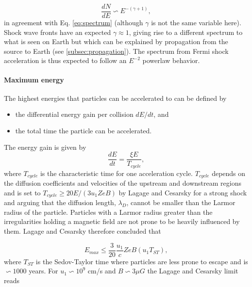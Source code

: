 \begin{equation}
\frac{dN}{dE} \backsim E^{-(\gamma + 1)},
\end{equation}
in agreement with Eq. \ref{eq:spectrum} (although $\gamma$ is not the same variable here). Shock wave fronts have an expected $\gamma \approx 1$, giving rise to a different spectrum to what is seen on Earth but which can be explained by propagation from the source to Earth (see \ref{subsec:propagation}). The spectrum from Fermi shock acceleration is thus expected to follow an $E^{-2}$ powerlaw behavior.

\paragraph{Maximum energy}
\label{para:maxenergy}
The highest energies that particles can be accelerated to can be defined by

\vspace{2mm}
\begin{itemize}
\item the differential energy gain per collision $dE/dt$, and
\item the total time the particle can be accelerated.
\end{itemize}
\vspace{2mm}
\noindent The energy gain is given by
\begin{equation}
\frac{dE}{dt} = \frac{\xi E}{T_{cycle}},
\end{equation}
where $T_{cycle}$ is the characteristic time for one acceleration cycle. $T_{cycle}$ depends on the diffusion coefficients and velocities of the upstream and downstream regions and is set to $T_{cycle} \geq 20 E/(3 u_1 Z e B)$ by Lagage and Cesarsky \cite{Lagage:1983zz} for a strong shock and arguing that the diffusion length, $\lambda_D$, cannot be smaller than the Larmor radius of the particle. Particles with a Larmor radius greater than the irregularities holding a magnetic field are not prone to be heavily influenced by them. Lagage and Cesarsky therefore concluded that

\begin{equation}
E_{max} \leq \frac{3}{20} \frac{u_1}{c} Z e B (u_1 T_{ST}),
\end{equation}
where $T_{ST}$ is the Sedov-Taylor time where particles are less prone to escape and is $\backsim 1000$ years. For $u_1 \backsim 10^9$ cm/s \cite{stanev2010high}  and $B \backsim 3\mu G$ the Lagage and Cesarsky limit reads

